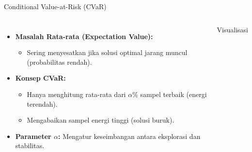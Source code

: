 \documentclass[10pt]{beamer}
\begin{document}
\begin{frame}{Conditional Value-at-Risk (CVaR)}
    \begin{columns}
        \begin{itemize}
            \item \textbf{Masalah Rata-rata (Expectation Value):}
            \begin{itemize}
                \item Sering menyesatkan jika solusi optimal jarang muncul (probabilitas rendah).
            \end{itemize}
            \item \textbf{Konsep CVaR:}
            \begin{itemize}
                \item Hanya menghitung rata-rata dari $\alpha\%$ sampel terbaik (energi terendah).
                \item Mengabaikan sampel energi tinggi (solusi buruk).
            \end{itemize}
            \item \textbf{Parameter $\alpha$:} Mengatur keseimbangan antara eksplorasi dan stabilitas.
        \end{itemize}
        
        \begin{block}{Visualisasi}
        \end{block}
    \end{columns}
\end{frame}

\end{document}
